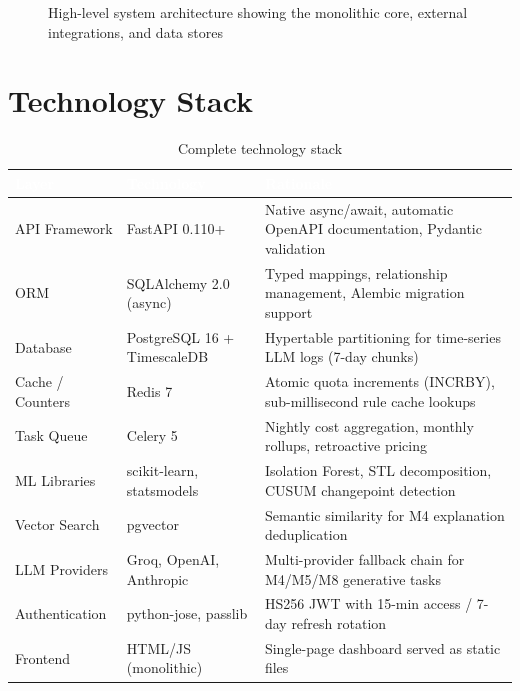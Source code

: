 \documentclass[12pt,a4paper,twoside]{report}
\begin{document}
\begin{figure}[H]
\caption{High-level system architecture showing the monolithic core, external integrations, and data stores}
\label{fig:architecture}
\end{figure}

\section{Technology Stack}

\begin{table}[H]
\centering
\begin{tabularx}{\textwidth}{|l|l|X|}
\hline
\rowcolor{tabheader}
\textcolor{white}{\textbf{Layer}} &
\textcolor{white}{\textbf{Technology}} &
\textcolor{white}{\textbf{Rationale}} \\
\hline
API Framework & FastAPI 0.110+ & Native async/await, automatic OpenAPI documentation, Pydantic validation \\
\hline
ORM & SQLAlchemy 2.0 (async) & Typed mappings, relationship management, Alembic migration support \\
\hline
Database & PostgreSQL 16 + TimescaleDB & Hypertable partitioning for time-series LLM logs (7-day chunks) \\
\hline
Cache / Counters & Redis 7 & Atomic quota increments (INCRBY), sub-millisecond rule cache lookups \\
\hline
Task Queue & Celery 5 & Nightly cost aggregation, monthly rollups, retroactive pricing \\
\hline
ML Libraries & scikit-learn, statsmodels & Isolation Forest, STL decomposition, CUSUM changepoint detection \\
\hline
Vector Search & pgvector & Semantic similarity for M4 explanation deduplication \\
\hline
LLM Providers & Groq, OpenAI, Anthropic & Multi-provider fallback chain for M4/M5/M8 generative tasks \\
\hline
Authentication & python-jose, passlib & HS256 JWT with 15-min access / 7-day refresh rotation \\
\hline
Frontend & HTML/JS (monolithic) & Single-page dashboard served as static files \\
\hline
\end{tabularx}
\caption{Complete technology stack}
\label{tab:techstack}
\end{table}
\end{document}
